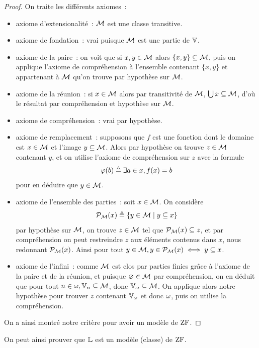 \begin{proof}
  On traite les différents axiomes~:
  \begin{itemize}
  \item axiome d'extensionalité~: $\mathcal{M}$ est une classe transitive.
  \item axiome de fondation~: vrai puisque $\mathcal{M}$ est une partie de $\mathbb V$.
  \item axiome de la paire~: on voit que si $x, y \in \mathcal{M}$ alors
    $\{x,y\} \subseteq \mathcal{M}$, puis on applique l'axiome de compréhension
    à l'ensemble contenant $\{x,y\}$ et appartenant à $\mathcal{M}$ qu'on trouve par
    hypothèse sur $\mathcal{M}$.
  \item axiome de la réunion~: si $x \in \mathcal{M}$ alors par transitivité de
    $\mathcal{M}$, $\bigcup x \subseteq \mathcal{M}$, d'où le résultat par compréhension
    et hypothèse sur $\mathcal{M}$.
  \item axiome de compréhension~: vrai par hypothèse.
  \item axiome de remplacement~: supposons que $f$ est une fonction dont le
    domaine est $x \in \mathcal{M}$ et l'image $y \subseteq \mathcal{M}$. Alors par
    hypothèse on trouve $z \in \mathcal{M}$ contenant $y$, et on utilise l'axiome de
    compréhension sur $z$ avec la formule
    \[\varphi(b) \triangleq \exists a \in x, f(x) = b\]
    pour en déduire que $y \in \mathcal{M}$.
  \item axiome de l'ensemble des parties~: soit $x \in \mathcal{M}$. On
    considère
    \[\mathcal{P}_{\mathcal{M}}(x) \triangleq \left\{ y \in \mathcal{M} \;\middle\vert\; y \subseteq x \right\}\]
    par hypothèse sur $\mathcal{M}$, on trouve $z \in \mathcal{M}$ tel que
    $\mathcal{P}_{\mathcal{M}}(x) \subseteq z$, et par compréhension on peut restreindre
    $z$ aux éléments contenus dans $x$, nous redonnant $\mathcal{P}_{\mathcal{M}}(x)$.
    Ainsi pour tout
    $y \in \mathcal{M}, y \in \mathcal{P}_{\mathcal{M}}(x) \iff y \subseteq x$.
  \item axiome de l'infini~: comme $\mathcal{M}$ est clos par parties finies grâce à
    l'axiome de la paire et de la réunion, et puisque $\varnothing \in \mathcal{M}$ par
    compréhension, on en déduit que pour tout $n \in\omega,\mathbb V_n\subseteq\mathcal{M}$,
    donc $\mathbb V_\omega \subseteq \mathcal{M}$. On applique alors notre hypothèse pour
    trouver $z$ contenant $\mathbb V_\omega$ et donc $\omega$, puis on utilise la
    compréhension.
  \end{itemize}
  On a ainsi montré notre critère pour avoir un modèle de $\operatorname{ZF}$.
\end{proof}

\noindent
On peut ainsi prouver que $\mathbb L$ est un modèle (classe) de $\operatorname{ZF}$.

